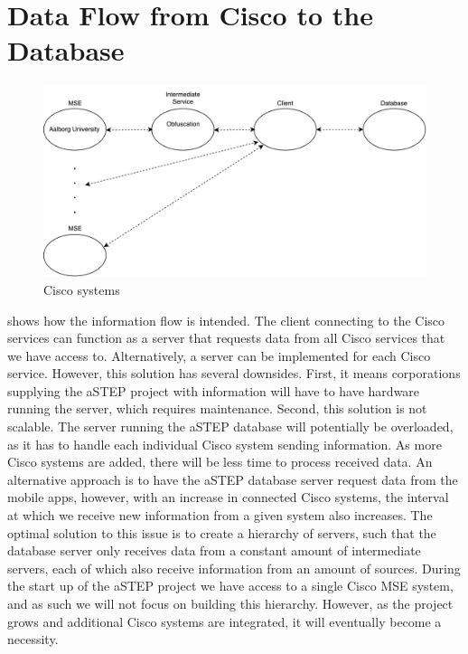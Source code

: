 \section{Data Flow from Cisco to the Database}\label{sec:data_flow}
\begin{figure}[ht]
	\begin{center}
		\includegraphics[scale=0.7]{graphics/ciscoNew.pdf}
		\caption{Cisco systems}
		\label{fig:cisco_systems}
	\end{center} 
\end{figure}
 shows how the information flow is intended. The client connecting to the Cisco services can function as a server that requests data from all Cisco services that we have access to. Alternatively, a server can be implemented for each Cisco service. However, this solution has several downsides. First, it means corporations supplying the aSTEP project with information will have to have hardware running the server, which requires maintenance. Second, this solution is not scalable. The server running the aSTEP database will potentially be overloaded, as it has to handle each individual Cisco system sending information. As more Cisco systems are added, there will be less time to process received data. An alternative approach is to have the aSTEP database server request data from the mobile apps, however, with an increase in connected Cisco systems, the interval at which we receive new information from a given system also increases. The optimal solution to this issue is to create a hierarchy of servers, such that the database server only receives data from a constant amount of intermediate servers, each of which also receive information from an amount of sources. During the start up of the aSTEP project we have access to a single Cisco MSE system, and as such we will not focus on building this hierarchy. However, as the project grows and additional Cisco systems are integrated, it will eventually become a necessity.

